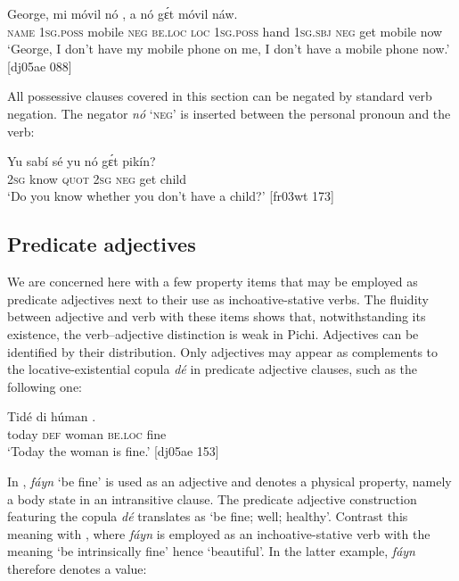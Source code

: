 \ea%
    \label{ex:key:828}
    \gll George,  mi    móvil  nó            ,  
a    nó  gɛ́t  móvil  náw.\\
\textsc{name}  \textsc{1sg.poss}  mobile  \textsc{neg}  \textsc{be.loc}  \textsc{loc}  \textsc{1sg.poss}  hand
\textsc{1sg.sbj}  \textsc{neg}  get  mobile  now\\

\glt ‘George, I don’t have my mobile phone on me, I don’t have 
a mobile phone now.’ [dj05ae 088]
\z

All possessive clauses covered in this section can be negated by standard verb negation. The negator \textit{nó} ‘\textsc{neg}’ is inserted between the personal pronoun and the verb:


\ea%
    \label{ex:key:829}
    \gll Yu  sabí    sé    yu  nó  gɛ́t  pikín?\\
\textsc{2sg}  know  \textsc{quot}    \textsc{2sg}  \textsc{neg}  get  child\\

\glt ‘Do you know whether you don’t have a child?’ [fr03wt 173]
\z

\subsection{Predicate adjectives}\label{sec:7.6.5}

We are concerned here with a few property items that may be employed as predicate adjectives next to their use as inchoative-stative verbs. The fluidity between adjective and verb with these items shows that, notwithstanding its existence, the verb–adjective distinction is weak in Pichi. Adjectives can be identified by their distribution. Only adjectives may appear as complements to the locative-existential copula \textit{dé} in predicate adjective clauses, such as the following one: 


\ea%
    \label{ex:key:830}
    \gll Tidé    di  húman      .\\
today  \textsc{def}  woman  \textsc{be.loc}  fine\\

\glt ‘Today the woman is fine.’ [dj05ae 153]
\z

In , \textit{fáyn} ‘be fine’ is used as an adjective and denotes a physical property, namely a body state in an intransitive clause. The predicate adjective construction featuring the copula \textit{dé} translates as ‘be fine; well; healthy’. Contrast this meaning with , where \textit{fáyn} is employed as an inchoative-stative verb with the meaning ‘be intrinsically fine’ hence ‘beautiful’. In the latter example, \textit{fáyn} therefore denotes a value:



